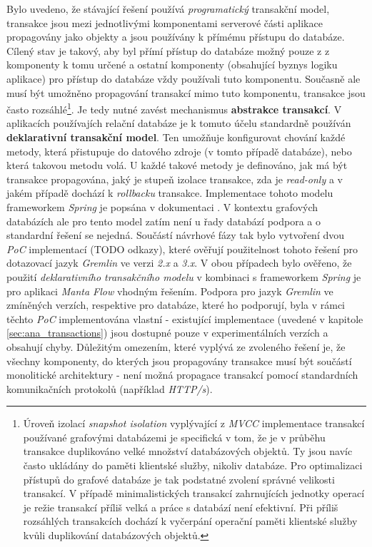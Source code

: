 Bylo uvedeno, že stávající řešení používá \textit{programatický} transakční model, transakce jsou mezi jednotlivými komponentami serverové části aplikace propagovány jako objekty a jsou používány k přímému přístupu do databáze. Cílený stav je takový, aby byl přímí přístup do databáze možný pouze z z komponenty k tomu určené a ostatní komponenty (obsahující byznys logiku aplikace) pro přístup do databáze vždy používali tuto komponentu. Současně ale musí být umožněno propagování transakcí mimo tuto komponentu, transakce jsou často rozsáhlé\footnote{Úroveň izolací \textit{snapshot isolation} vyplývající z \textit{MVCC} implementace transakcí používané grafovými databázemi je specifická v tom, že je v průběhu transakce duplikováno velké množství databázových objektů. Ty jsou navíc často ukládány do paměti klientské služby, nikoliv databáze. Pro optimalizaci přístupů do grafové databáze je tak podstatné zvolení správné velikosti transakcí. V případě minimalistických transakcí zahrnujících jednotky operací je režie transakcí příliš velká a práce s databází není efektivní. Při příliš rozsáhlých transakcích dochází k vyčerpání operační paměti klientské služby kvůli duplikování databázových objektů.}. Je tedy nutné zavést mechanismus \textbf{abstrakce transakcí}.
V aplikacích používajích relační databáze je k tomuto účelu standardně používán \textbf{deklarativní transakční model}. Ten umožňuje konfigurovat chování každé metody, která přistupuje do datového zdroje (v tomto případě databáze), nebo která takovou metodu volá. U každé takové metody je definováno, jak má být transakce propagována, jaký je stupeň izolace transakce, zda je \textit{read-only} a v jakém případě dochází k \textit{rollbacku} transakce. Implementace tohoto modelu frameworkem \textit{Spring} je popsána v dokumentaci \cite{SpringTransactions}.
V kontextu grafových databázích ale pro tento model zatím není u řady databází podpora a o standardní řešení se nejedná. Součástí návrhové fázy tak bylo vytvoření dvou \textit{PoC} implementací (TODO odkazy), které ověřují použitelnost tohoto řešení pro dotazovací jazyk \textit{Gremlin} ve verzi \textit{2.x} a \textit{3.x}. V obou případech bylo ověřeno, že použití \textit{deklarativního transakčního modelu} v kombinaci s frameworkem \textit{Spring} je pro aplikaci \textit{Manta Flow} vhodným řešením. Podpora pro jazyk \textit{Gremlin} ve zmíněných verzích, respektive pro databáze, které ho podporují, byla v rámci těchto \textit{PoC} implementována vlastní - existující implementace (uvedené v kapitole \ref{sec:ana_transactions}) jsou dostupné pouze v experimentálních verzích a obsahují chyby.
Důležitým omezením, které vyplývá ze zvoleného řešení je, že všechny komponenty, do kterých jsou propagovány transakce musí být součástí monolitické architektury - není možná propagace transakcí pomocí standardních komunikačních protokolů (například \textit{HTTP/s}).





